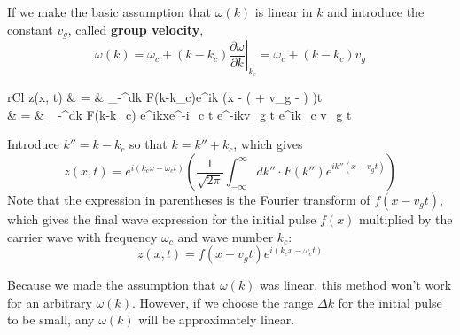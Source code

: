 \documentclass[11pt]{article}
\begin{document}
	If we make the basic assumption that $\omega(k)$ is linear in $k$ and introduce the constant $v_g$, called \textbf{group velocity},
	\begin{equation}
		\omega(k) = \omega_c + (k - k_c) \left.\frac{\partial \omega}{\partial k}\right|_{k_c} = \omega_c + (k - k_c)v_g
	\end{equation}
	\begin{IEEEeqnarray}{rCl}
		z(x, t) & = &  \int_{-\infty}^\infty dk \cdot F(k-k_c)e^{\displaystyle ik \left(x - ( + v_g - ) \right)t}\\
		& = &  \int_{-\infty}^\infty dk \cdot F(k-k_c) e^{ikx}e^{-i\omega_c t} e^{-ikv_g t} e^{ik_c v_g t}
	\end{IEEEeqnarray}
	
	Introduce $k'' = k - k_c$ so that $k = k'' + k_c$, which gives
	\begin{equation}
		z(x, t) = e^{i(k_c x - \omega_c t)} \left( \frac{1}{\sqrt{2\pi}} \int_{-\infty}^\infty dk'' \cdot F(k'')e^{ik''(x - v_g t)} \right)
	\end{equation}
	Note that the expression in parentheses is the Fourier transform of $f(x - v_g t)$, which gives the final wave expression for the initial pulse $f(x)$ multiplied by the carrier wave with frequency $\omega_c$ and wave number $k_c$:
	\begin{equation}
		z(x, t) = f(x - v_g t)e^{i(k_c x - \omega_c t)}
	\end{equation}
	
	Because we made the assumption that $\omega(k)$ was linear, this method won't work for an arbitrary $\omega(k)$. However, if we choose the range $\Delta k$ for the initial pulse to be small, any $\omega(k)$ will be approximately linear.

%		
%		


\end{document}
